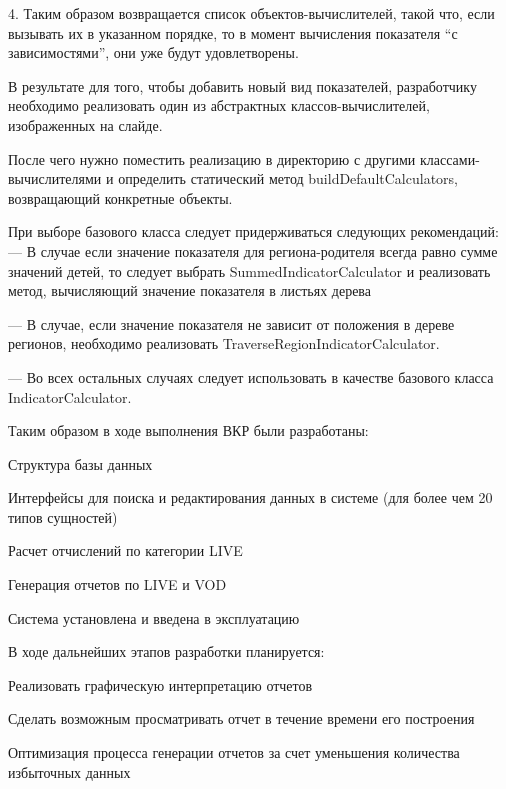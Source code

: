 \documentclass[a4paper]{article}
\begin{document}
4. Таким образом возвращается список объектов-вычислителей, такой что, если вызывать их в указанном порядке, то в момент вычисления показателя “с зависимостями”, они уже будут удовлетворены.

\newpage

В результате для того, чтобы добавить новый вид показателей, разработчику необходимо
реализовать один из абстрактных классов-вычислителей, изображенных на слайде.

После чего нужно поместить реализацию в директорию с другими классами-вычислителями
и определить статический метод buildDefaultCalculators, возвращающий конкретные объекты.

При выборе базового класса следует придерживаться следующих рекомендаций:
--- В случае если значение показателя для региона-родителя всегда равно сумме значений детей, то следует выбрать SummedIndicatorCalculator и реализовать метод, вычисляющий значение показателя в листьях дерева

--- В случае, если значение показателя не зависит от положения в дереве регионов, необходимо реализовать TraverseRegionIndicatorCalculator.

--- Во всех остальных случаях следует использовать в качестве базового класса IndicatorCalculator.

\newpage

Таким образом в ходе выполнения ВКР были разработаны:

Структура базы данных 

Интерфейсы для поиска и редактирования данных в системе (для более чем 20 типов сущностей)

Расчет отчислений по категории LIVE

Генерация отчетов по LIVE и VOD

Система установлена и введена в эксплуатацию

\newpage
В ходе дальнейших этапов разработки планируется:

Реализовать графическую интерпретацию отчетов

Сделать возможным просматривать отчет в течение времени его построения

Оптимизация процесса генерации отчетов за счет уменьшения количества избыточных данных
\end{document}
